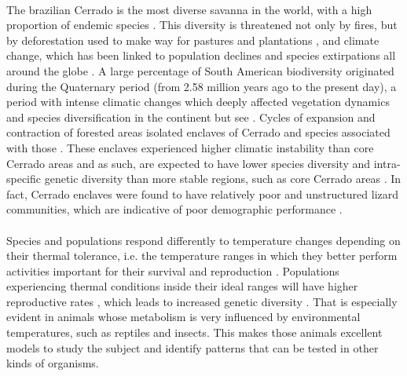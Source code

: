\documentclass{article}
\begin{document}
{\paragraph{} The brazilian Cerrado is the most diverse savanna in the world, with a high proportion of endemic species \cite{oliveira2002cerrados}. This diversity is threatened not only by fires, but by deforestation used to make way for pastures and plantations \cite{ratter1997brazilian}, and climate change, which has been linked to population declines and species extirpations all around the globe \cite{bellard2012impacts}. A large percentage of South American biodiversity originated during the Quaternary period (from 2.58 million years ago to the present day), a period with intense climatic changes which deeply affected vegetation dynamics and species diversification in the continent \cite{mayle2004assessment, carnaval2009stability, werneck2011diversification, collevatti2012recovering, werneck2012climatic, ledo2017historical, costa2018biome} but see \cite{melo2016coalescent}. Cycles of expansion and contraction of forested areas isolated enclaves of Cerrado and species associated with those \cite{van1974pleistocene, absy1976some, van1994amazonia, mayle2004assessment}. These enclaves experienced higher climatic instability than core Cerrado areas \cite{werneck2012climatic} and as such, are expected to have lower species diversity and intra-specific genetic diversity than more stable regions, such as core Cerrado areas \cite{werneck2011diversification, carnaval2009stability, carnaval2008historical}. In fact, Cerrado enclaves were found to have relatively poor and unstructured lizard communities, which are indicative of poor demographic performance \cite{gainsbury2003lizard}. 



\paragraph{} Species and populations respond differently to temperature changes depending on their thermal tolerance, i.e. the temperature ranges in which they  better perform activities important for their survival and reproduction \cite{porter1973behavioral}. Populations experiencing thermal conditions inside their ideal ranges will have higher reproductive rates \cite{adolph1993temperature}, which leads to increased genetic diversity \cite{zamudio2016phenotypes}. That is especially evident in animals whose metabolism is very influenced by environmental temperatures, such as reptiles and insects. This makes those animals excellent models to study the subject and identify patterns that can be tested in other kinds of organisms.

}
\end{document}
